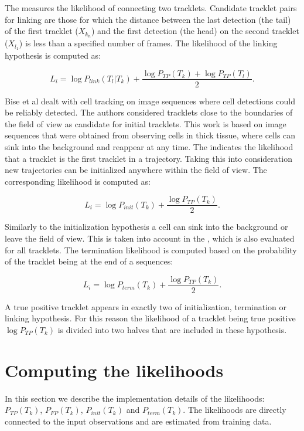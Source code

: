 		The  measures the likelihood of connecting two tracklets. Candidate tracklet pairs for linking are those for which the distance between the last detection (the tail) of the first tracklet ($X_{k_n}$)  and the first detection (the head) on the second tracklet ($X_{l_1}$) is less than a specified number of frames. The likelihood of the linking hypothesis is computed as:
		
		\[
			L_i = \log P_{link}(T_l | T_k) + \frac{\log P_{TP}(T_k) + \log P_{TP}(T_l)}{2} \text{.}
		\]
		
		Bise et al \cite{bise11global} dealt with cell tracking on image sequences where cell detections could be reliably detected. The authors considered tracklets close to the boundaries of the field of view as candidate for initial tracklets. This work is based on image sequences that were obtained from observing cells in thick tissue, where cells can sink into the background and reappear at any time. The  indicates the likelihood that a tracklet is the first tracklet in a trajectory. Taking this into consideration new trajectories can be initialized anywhere within the field of view. The corresponding likelihood is computed as:
		
		\[
			L_i = \log P_{init}(T_k) + \frac{\log P_{TP}(T_k)}{2}\text{.}
		\]
		
			
		Similarly to the initialization hypothesis a cell can sink into the background or leave the field of view. This is taken into account in the , which is also evaluated for all tracklets. The termination likelihood is computed based on the probability of the tracklet being at the end of a sequences:
		
		\[
			L_i = \log P_{term}(T_k) + \frac{\log P_{TP}(T_k)}{2}\text{.}
		\]
		
		A true positive tracklet appears in exactly two of initialization, termination or linking hypothesis. For this reason the likelihood of a tracklet being true positive $\log P_{TP}(T_k)$ is divided into two halves that are included in these hypothesis.
       	
    \section{Computing the likelihoods \statusfirstdraft}
       	\label{sec:computinglikelihoods}
       	
       	In this section we describe the implementation details of the likelihoods: $P_{TP}(T_k)$, $P_{FP}(T_k)$, $P_{init}(T_k)$ and $P_{term}(T_k)$. The likelihoods are directly connected to the input observations and are estimated from training data.     			


